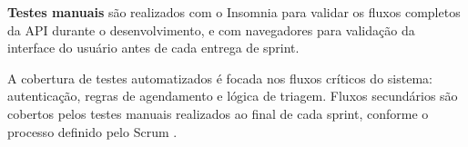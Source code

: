 \textbf{Testes manuais} são realizados com o
Insomnia para validar os fluxos completos da API
durante o desenvolvimento, e com navegadores para
validação da interface do usuário antes de cada
entrega de sprint.

A cobertura de testes automatizados é focada nos
fluxos críticos do sistema: autenticação, regras de
agendamento e lógica de triagem. Fluxos secundários
são cobertos pelos testes manuais realizados ao
final de cada sprint, conforme o processo definido
pelo Scrum \cite{schwaber2020}.
